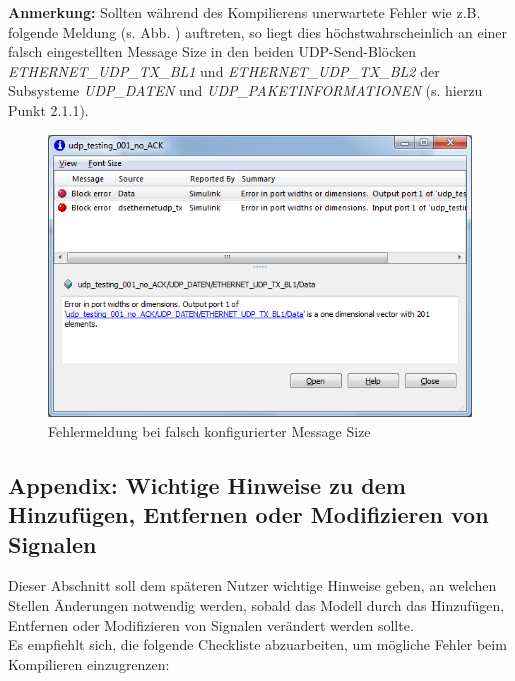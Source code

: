 \documentclass[fontsize = 12pt, paper = a4]{scrreprt}
\begin{document}
\textbf{Anmerkung:} Sollten während des Kompilierens unerwartete Fehler wie z.B. folgende Meldung (s. Abb. ) auftreten, so liegt dies höchstwahrscheinlich an einer falsch eingestellten Message Size in den beiden UDP-Send-Blöcken \textit{ETHERNET\_UDP\_TX\_BL1} und \textit{ETHERNET\_UDP\_TX\_BL2} der Subsysteme \textit{UDP\_DATEN} und \textit{UDP\_PAKETINFORMATIONEN} (s. hierzu Punkt 2.1.1).

\begin{figure}[h]
\centering
\includegraphics[scale = 0.48]{fehlermsgsize}
\caption[Fehlermeldung bei falsch konfigurierter Message Size]{Fehlermeldung bei falsch konfigurierter Message Size}
\label{fehlermsgsize}
\end{figure} 

\newpage


\subsection{Appendix: Wichtige Hinweise zu dem Hinzufügen, Entfernen oder Modifizieren von Signalen}

Dieser Abschnitt soll dem späteren Nutzer wichtige Hinweise geben, an welchen Stellen Änderungen notwendig werden, sobald das Modell durch das Hinzufügen, Entfernen oder Modifizieren von Signalen verändert werden sollte. \\

Es empfiehlt sich, die folgende Checkliste abzuarbeiten, um mögliche Fehler beim Kompilieren einzugrenzen:
\end{document}
